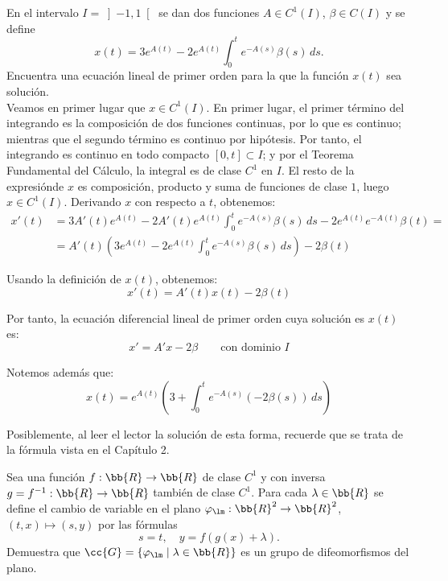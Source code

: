 \documentclass[12pt]{article}
\begin{document}
    \begin{ejercicio}
        En el intervalo $I = \left]-1, 1\right[$ se dan dos funciones $A \in C^1(I)$, $\beta \in C(I)$ y se define
        \begin{equation*}
            x(t) = 3e^{A(t)} - 2e^{A(t)}\int_0^t e^{-A(s)}\beta(s)\,ds.
        \end{equation*}
        Encuentra una ecuación lineal de primer orden para la que la función $x(t)$ sea solución.\\

        Veamos en primer lugar que $x\in C^1(I)$. En primer lugar, el primer término del integrando es la composición de dos funciones continuas, por lo que es continuo; mientras que el segundo término es continuo por hipótesis. Por tanto, el integrando es continuo en todo compacto $[0,t]\subset I$; y por el Teorema Fundamental del Cálculo, la integral es de clase $C^1$ en $I$. El resto de la expresiónde $x$ es composición, producto y suma de funciones de clase $1$, luego $x\in C^1(I)$. Derivando $x$ con respecto a $t$, obtenemos:
        \begin{align*}
            x'(t) &= 3A'(t)e^{A(t)} - 2A'(t)e^{A(t)}\int_0^t e^{-A(s)}\beta(s)\,ds - 2e^{A(t)}e^{-A(t)}\beta(t)=\\
            &= A'(t)\left(3e^{A(t)} - 2e^{A(t)}\int_0^t e^{-A(s)}\beta(s)\,ds\right) - 2\beta(t)
        \end{align*}

        Usando la definición de $x(t)$, obtenemos:
        \begin{equation*}
            x'(t) = A'(t)x(t) - 2\beta(t)
        \end{equation*}

        Por tanto, la ecuación diferencial lineal de primer orden cuya solución es $x(t)$ es:
        \begin{equation*}
            x'=A'x-2\beta \qquad \text{con dominio } I
        \end{equation*}

        Notemos además que:
        \begin{equation*}
            x(t)=e^{A(t)}\left(3+\int_0^t e^{-A(s)}(-2 \beta(s))\,ds\right)
        \end{equation*}

        Posiblemente, al leer el lector la solución de esta forma, recuerde que se trata de la fórmula vista en el Capítulo 2.
    \end{ejercicio}

    \begin{ejercicio}
        Sea una función $f : \bb{R} \to \bb{R}$ de clase $C^1$ y con inversa $g = f^{-1} : \bb{R} \to \bb{R}$ también de clase $C^1$. Para cada $\lambda \in \bb{R}$ se define el cambio de variable en el plano $\varphi_\lm : \bb{R}^2 \to \bb{R}^2$, $(t, x) \mapsto (s, y)$ por las fórmulas
        \begin{equation*}
            s = t, \quad y = f(g(x) + \lambda).
        \end{equation*}
        Demuestra que $\cc{G} = \{\varphi_\lm \mid \lambda \in \bb{R}\}$ es un grupo de difeomorfismos del plano.
    \end{ejercicio}
\end{document}
